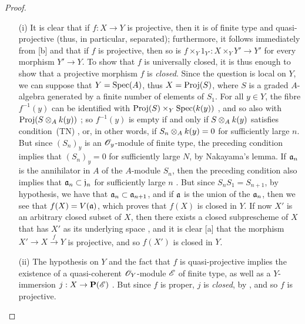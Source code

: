 \begin{proof}
\medskip\noindent
\begin{enumerate}
  \item[(i)] It is clear that if $f:X\to Y$ is projective, then it is of finite type and quasi-projective (thus, in particular, separated); furthermore, it follows immediately from [b] and  that if $f$ is projective, then so is $f\times_Y 1_{Y'}:X\times_Y Y'\to Y'$ for every morphism $Y'\to Y$.
     To show that $f$ is universally closed, it is thus enough to show that a projective morphism $f$ is \emph{closed}.
     Since the question is local on $Y$, we can suppose that $Y=\operatorname{Spec}(A)$, thus  $X=\operatorname{Proj}(S)$, where $S$ is a graded $A$-algebra generated by a finite number of elements of $S_1$.
     For all $y\in Y$, the fibre $f^{-1}(y)$ can be identified with $\operatorname{Proj}(S)\times_Y\operatorname{Spec}(k(y))$ , and so also with $\operatorname{Proj}(S\otimes_Ak(y))$ ;
     so $f^{-1}(y)$ is empty if and only if $S\otimes_Ak(y)$ satisfies condition~(TN) , or, in other words, if $S_n\otimes_Ak(y)=0$ for sufficiently large $n$.
     But since $(S_n)_y$ is an $\mathscr{O}_y$-module of finite type, the preceding condition implies that $(S_n)_y=0$ for sufficiently large $N$, by Nakayama's lemma.
     If $\mathfrak{a}_n$ is the annihilator in $A$ of the $A$-module $S_n$, then the preceding condition also implies that $\mathfrak{a}_n\subset\mathfrak{j}_n$ for sufficiently large $n$ .
     But since $S_nS_1=S_{n+1}$, by hypothesis, we have that $\mathfrak{a}_n\subset\mathfrak{a}_{n+1}$, and if $\mathfrak{a}$ is the union of the $\mathfrak{a}_n$, then we see that $f(X)=V(\mathfrak{a})$, which proves that $f(X)$ is closed in $Y$.
     If now $X'$ is an arbitrary closed subset of $X$, then there exists a closed subprescheme of $X$ that has $X'$ as its underlying space , and it is clear [a] that the morphism $X'\to X\xrightarrow{f}Y$ is projective, and so $f(X')$ is closed in $Y$.
   \item[(ii)] The hypothesis on $Y$ and the fact that $f$ is quasi-projective implies the existence of a quasi-coherent $\mathscr{O}_Y$-module $\mathscr{E}$ of finite type, as well as a $Y$-immersion $j:X\to\bb{P}(\sh{E})$ .
      But since $f$ is proper, $j$ is \emph{closed}, by , and so $f$ is projective.
\end{enumerate}
\end{proof}

